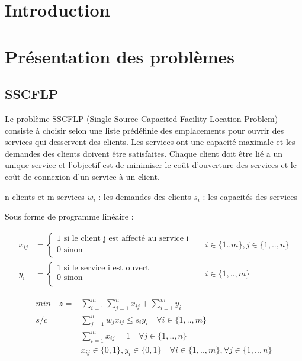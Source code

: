 \section{Introduction}

\section{Présentation des problèmes}

\subsection{SSCFLP}

Le problème SSCFLP (Single Source Capacited Facility Location Problem) consiste à choisir selon une liste prédéfinie des emplacements pour ouvrir des services qui desservent des clients. Les services ont une capacité maximale et les demandes des clients doivent être satisfaites. Chaque client doit être lié a un unique service et l'objectif est de minimiser le  coût d'ouverture des services et le coût de connexion d'un service à un client. \newline

n clients et m services
$w_i$ : les demandes des clients
$s_i$ : les capacités des services

Sous forme de programme linéaire :


\begin{align*}
x_{ij} &= \begin{cases}
        1 \text{ si le client j est affecté au service i}\\
        0 \text{ sinon} \\
    \end{cases}
&&i \in \{1..m\}, j \in \{1,..,n\} \\
y_i &= \begin{cases}
        1 \text{ si le service i est ouvert}\\
        0 \text{ sinon} \\
    \end{cases}
&&i \in \{1,..,m\}
\end{align*}



\begin{align}
min \quad z = &\sum\limits_{i=1}^m \sum\limits_{j=1}^n x_{ij} + \sum\limits_{i=1}^m y_i \\
  s/c \quad &\sum\limits_{j=1}^n w_j x_{ij} \leq s_i y_i \quad \forall i \in \{1, .., m\} \\
            &\sum\limits_{i=1}^m x_{ij} = 1 \quad \forall j \in \{1, .., n\} \\
            &x_{ij} \in \{0,1\}, y_i \in \{0,1\} \quad \forall i \in \{1,..,m\}, \forall j \in \{1,..,n\}
\end{align}

